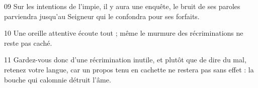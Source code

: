 
09 Sur les intentions de l’impie, il y aura une enquête, le bruit de ses paroles parviendra jusqu’au Seigneur qui le confondra pour ses forfaits.

10 Une oreille attentive écoute tout ; même le murmure des récriminations ne reste pas caché.

11 Gardez-vous donc d’une récrimination inutile, et plutôt que de dire du mal, retenez votre langue, car un propos tenu en cachette ne restera pas sans effet : la bouche qui calomnie détruit l’âme.